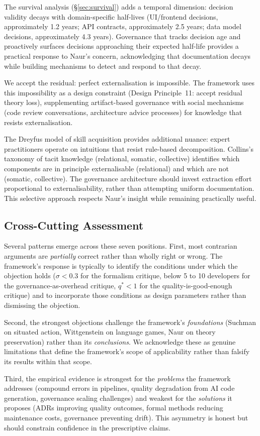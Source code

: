 The survival analysis (\S\ref{sec:survival}) adds a temporal dimension: decision validity decays with domain-specific half-lives (UI/frontend decisions, approximately 1.2 years; API contracts, approximately 2.5 years; data model decisions, approximately 4.3 years). Governance that tracks decision age and proactively surfaces decisions approaching their expected half-life provides a practical response to Naur's concern, acknowledging that documentation decays while building mechanisms to detect and respond to that decay.

We accept the residual: perfect externalisation is impossible. The framework uses this impossibility as a design constraint (Design Principle~11: accept residual theory loss), supplementing artifact-based governance with social mechanisms (code review conversations, architecture advice processes) for knowledge that resists externalisation.

The Dreyfus model of skill acquisition provides additional nuance: expert
practitioners operate on intuitions that resist rule-based decomposition.
Collins's taxonomy of tacit knowledge (relational, somatic, collective)
identifies which components are in principle externalisable (relational) and
which are not (somatic, collective).  The governance architecture should invest
extraction effort proportional to externalisability, rather than attempting
uniform documentation.  This selective approach respects Naur's insight while
remaining practically useful.


\subsection{Cross-Cutting Assessment}

Several patterns emerge across these seven positions.  First, most contrarian
arguments are \emph{partially} correct rather than wholly right or wrong.  The
framework's response is typically to identify the conditions under which the
objection holds ($\sigma < 0.3$ for the formalism critique, below 5 to 10
developers for the governance-as-overhead critique, $q^* < 1$ for the
quality-is-good-enough critique) and to incorporate those conditions as design
parameters rather than dismissing the objection.

Second, the strongest objections challenge the framework's \emph{foundations}
(Suchman on situated action, Wittgenstein on language games, Naur on
theory preservation) rather than its \emph{conclusions}.  We acknowledge these
as genuine limitations that define the framework's scope of applicability rather
than falsify its results within that scope.

Third, the empirical evidence is strongest for the \emph{problems} the framework
addresses (compound errors in pipelines, quality degradation from AI code
generation, governance scaling challenges) and weakest for the \emph{solutions}
it proposes (ADRs improving quality outcomes, formal methods reducing
maintenance costs, governance preventing drift).  This asymmetry is honest but
should constrain confidence in the prescriptive claims.



